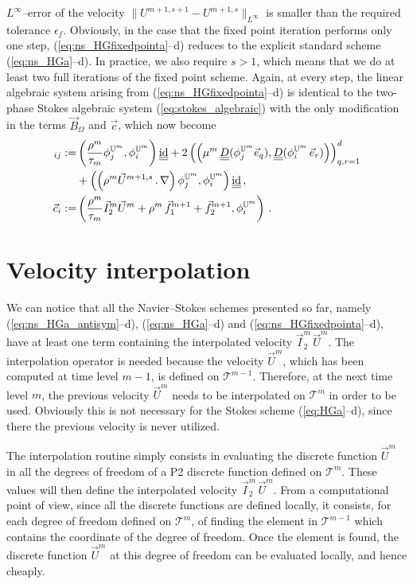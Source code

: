 $L^\infty$--error of the velocity $\|U^{m+1,s+1}-U^{m+1,s} \|_{L^\infty}$ is
smaller than the required tolerance $\epsilon_f$. Obviously, in the case that
the fixed point iteration performs only one step,
(\ref{eq:ns_HGfixedpointa}--d) reduces to the explicit standard scheme
(\ref{eq:ns_HGa}--d). In practice, we also require $s>1$, which means that we
do at least two full iterations of the fixed point scheme. Again, at every
step, the linear algebraic system arising from (\ref{eq:ns_HGfixedpointa}--d)
is identical to the two-phase Stokes algebraic system
(\ref{eq:stokes_algebraic}) with the only modification in the terms
$\vec B_{\Omega}$ and $\vec c$, which now become
\begin{align*}
[\vec B_\Omega]_{ij} := & \left( \frac{\rho^m}{\tau_m} \phi_j^{\uspacesimple^m},
\phi_i^{\uspacesimple^m} \right)\mat \id
+ 2\left(\left(\mu^m\,\mat D(\phi_j^{\uspacesimple^m} \vec e_q),
\mat D(\phi_i^{\uspacesimple^m}\,\vec e_r) \right) \right)_{q,r=1}^d\\
& + \left( \left(\rho^m \vec U^{m+1,s}\,.\,\nabla \right)
\phi_j^{\uspacesimple^m},
\phi_i^{\uspacesimple^m} \right)\mat \id \,,\\
\vec c_i := &\left( \frac{\rho^m}{\tau_m}\vec I_2^m\vec U^m +
\rho^m\,\vec f_1^{m+1}+\vec f_2^{m+1},\phi_i^{\uspacesimple^m}\right)\,.
\end{align*}

\section{Velocity interpolation}\label{sec:ns_velocity_interpolation}
We can notice that all the Navier--Stokes schemes presented so far, namely
(\ref{eq:ns_HGa_antisym}--d), (\ref{eq:ns_HGa}--d) and
(\ref{eq:ns_HGfixedpointa}--d), have at least one term containing the
interpolated velocity $\vec I^m_2\,\vec U^m$. The interpolation operator is
needed because the velocity $\vec U^m$, which has been computed at time level
$m-1$, is defined on $\mathcal{T}^{m-1}$. Therefore, at the next time level
$m$, the previous velocity $\vec U^m$ needs to be interpolated on
$\mathcal{T}^m$ in order to be used. Obviously this is not necessary for the
Stokes scheme (\ref{eq:HGa}--d), since there the previous velocity is never
utilized.

The interpolation routine simply consists in evaluating the discrete function
$\vec U^m$ in all the degrees of freedom of a P2 discrete function defined on
$\mathcal{T}^m$. These values will then define the interpolated velocity
$\vec I^m_2\,\vec U^m$. From a computational point of view, since all the
discrete functions are defined locally, it consists, for each degree of
freedom defined on $\mathcal{T}^m$, of finding the element in
$\mathcal{T}^{m-1}$ which contains the coordinate of the degree of freedom.
Once the element is found, the discrete function $\vec U^m$ at this degree of
freedom can be evaluated locally, and hence cheaply.

